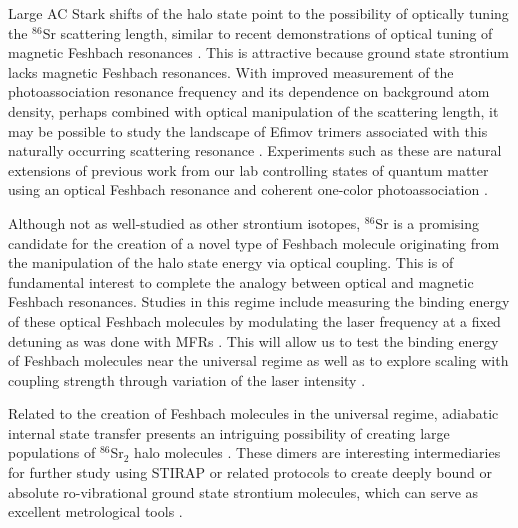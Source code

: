 Large AC Stark shifts of the halo state point to the possibility of optically tuning the $^{86}$Sr scattering length, similar to recent demonstrations of optical tuning of magnetic Feshbach resonances \cite{blv09,chx15}. 
This is attractive because ground state strontium lacks magnetic Feshbach resonances.
With improved measurement of the photoassociation resonance frequency and its dependence on background atom density, perhaps combined with optical manipulation of the scattering length, it may be possible to study the landscape of Efimov trimers associated with this naturally occurring scattering resonance \cite{nen17,mwc17,bha07,wie12}.
Experiments such as these are natural extensions of previous work from our lab controlling states of quantum matter using an optical Feshbach resonance and coherent one-color photoassociation \cite{Hofer2015,Nicholson2015a,Yan2013c, Yan2013b}.

Although not as well-studied as other strontium isotopes, $^{86}$Sr is a promising candidate for the creation of a novel type of Feshbach molecule originating from the manipulation of the halo state energy via optical coupling.
This is of fundamental interest to complete the analogy between optical and magnetic Feshbach resonances.
Studies in this regime include measuring the binding energy of these optical Feshbach molecules by modulating the laser frequency at a fixed detuning as was done with MFRs \cite{Kohler2006,smg06,Kohler2005}. 
This will allow us to test the binding energy of Feshbach molecules near the universal regime as well as to explore scaling with coupling strength through variation of the laser intensity \cite{Chin2010,Jones2006,Nicholson2015a,Pachomov2017,Reschovsky}.

Related to the creation of Feshbach molecules in the universal regime, adiabatic internal state transfer presents an intriguing possibility of creating large populations of $^{86}$Sr$_2$ halo molecules \cite{Quemener2017,Quemener2012,Lang2008}.
These dimers are interesting intermediaries for further study using STIRAP or related protocols to create deeply bound or absolute ro-vibrational ground state strontium molecules, which can serve as excellent metrological tools \cite{dvm04, Skomorowski2012, zky08, Stellmer2012, Reinaudi2012}.

